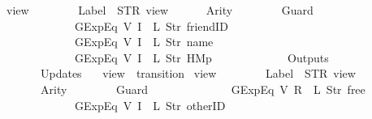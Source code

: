 \begin{isabellebody}
{\isachardoublequoteopen}view\ {\isasymequiv}\ {\isasymlparr}\isanewline
\ \ \ \ \ \ Label\ {\isacharequal}\ STR\ {\isacharprime}{\isacharprime}view{\isacharprime}{\isacharprime}{\isacharcomma}\isanewline
\ \ \ \ \ \ Arity\ {\isacharequal}\ {}{\isacharcomma}\isanewline
\ \ \ \ \ \ Guard\ {\isacharequal}\ {\isacharbrackleft}\isanewline
\ \ \ \ \ \ \ \ \ \ \ \ GExp{\isachardot}Eq\ {\isacharparenleft}V\ {\isacharparenleft}I\ {}{\isacharparenright}{\isacharparenright}\ {\isacharparenleft}L\ {\isacharparenleft}Str\ {\isacharprime}{\isacharprime}friendID{\isacharprime}{\isacharprime}{\isacharparenright}{\isacharparenright}{\isacharcomma}\isanewline
\ \ \ \ \ \ \ \ \ \ \ \ GExp{\isachardot}Eq\ {\isacharparenleft}V\ {\isacharparenleft}I\ {}{\isacharparenright}{\isacharparenright}\ {\isacharparenleft}L\ {\isacharparenleft}Str\ {\isacharprime}{\isacharprime}name{\isacharprime}{\isacharprime}{\isacharparenright}{\isacharparenright}{\isacharcomma}\isanewline
\ \ \ \ \ \ \ \ \ \ \ \ GExp{\isachardot}Eq\ {\isacharparenleft}V\ {\isacharparenleft}I\ {}{\isacharparenright}{\isacharparenright}\ {\isacharparenleft}L\ {\isacharparenleft}Str\ {\isacharprime}{\isacharprime}HM{}p{\isacharprime}{\isacharprime}{\isacharparenright}{\isacharparenright}\isanewline
\ \ \ \ \ \ {\isacharbrackright}{\isacharcomma}\isanewline
\ \ \ \ \ \ Outputs\ {\isacharequal}\ {\isacharbrackleft}{\isacharbrackright}{\isacharcomma}\isanewline
\ \ \ \ \ \ Updates\ {\isacharequal}\ {\isacharbrackleft}{\isacharbrackright}\isanewline
{\isasymrparr}{\isachardoublequoteclose}\isanewline
\isanewline
{}\isamarkupfalse%
\ {\isachardoublequoteopen}view{}{\isachardoublequoteclose}\ {\isacharcolon}{\isacharcolon}\ {\isachardoublequoteopen}transition{\isachardoublequoteclose}\ \isanewline
{\isachardoublequoteopen}view{}\ {\isasymequiv}\ {\isasymlparr}\isanewline
\ \ \ \ \ \ Label\ {\isacharequal}\ STR\ {\isacharprime}{\isacharprime}view{\isacharprime}{\isacharprime}{\isacharcomma}\isanewline
\ \ \ \ \ \ Arity\ {\isacharequal}\ {}{\isacharcomma}\isanewline
\ \ \ \ \ \ Guard\ {\isacharequal}\ {\isacharbrackleft}\isanewline
\ \ \ \ \ \ \ \ \ \ \ \ GExp{\isachardot}Eq\ {\isacharparenleft}V\ {\isacharparenleft}R\ {}{\isacharparenright}{\isacharparenright}\ {\isacharparenleft}L\ {\isacharparenleft}Str\ {\isacharprime}{\isacharprime}free{\isacharprime}{\isacharprime}{\isacharparenright}{\isacharparenright}{\isacharcomma}\isanewline
\ \ \ \ \ \ \ \ \ \ \ \ GExp{\isachardot}Eq\ {\isacharparenleft}V\ {\isacharparenleft}I\ {}{\isacharparenright}{\isacharparenright}\ {\isacharparenleft}L\ {\isacharparenleft}Str\ {\isacharprime}{\isacharprime}otherID{\isacharprime}{\isacharprime}{\isacharparenright}{\isacharparenright}{\isacharcomma}\isanewline

\end{isabellebody}
